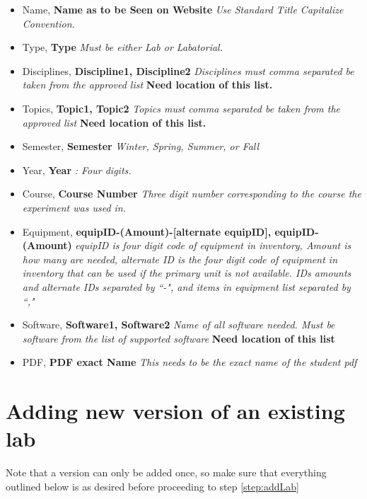 \documentclass[justified]{book}
\begin{document}
\begin{enumerate}
\begin{itemize}
\item Name, \textbf{Name as to be Seen on Website} \textit{ Use Standard Title Capitalize Convention.}
\item Type, \textbf{Type} \textit{ Must be either Lab or Labatorial.}
\item Disciplines, \textbf{Discipline1, Discipline2} \textit{ Disciplines must comma separated be taken from the approved list} \textbf{Need location of this list.}
\item Topics, \textbf{Topic1, Topic2} \textit{ Topics must comma separated be taken from the approved list} \textbf{Need location of this list.}
\item Semester, \textbf{Semester} \textit{ Winter, Spring, Summer, or Fall}
\item Year, \textbf{Year} \textit{: Four digits.}
\item Course, \textbf{Course Number} \textit{ Three digit number corresponding to the course the experiment was used in.}
\item Equipment, \textbf{equipID-(Amount)-[alternate equipID], equipID-(Amount)} \textit{ equipID is four digit code of equipment in inventory, Amount is how many are needed, alternate ID is the four digit code of equipment in inventory that can be used if the primary unit is not available. IDs amounts and alternate IDs separated by ``-", and items in equipment list separated by ``,"}
\item Software, \textbf{Software1, Software2} \textit{ Name of all software needed. Must be software from the list of supported software} \textbf{Need location of this list}
\item PDF, \textbf{PDF exact Name} \textit{ This needs to be the exact name of the student pdf}
\end{itemize}	

\end{enumerate}

\section{Adding new version of an existing lab}

Note that a version can only be added once, so make sure that everything outlined below is as desired before proceeding to step \ref{step:addLab}
\end{document}
